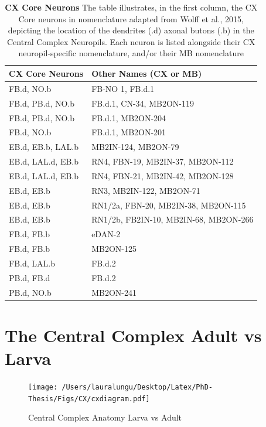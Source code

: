         \begin{table}[h!]
        \centering
        \begin{tabular}{|l|l|}
        \hline
        \textbf{CX Core Neurons} & \textbf{Other Names (CX or MB)} \\
        \hline
        FB.d, NO.b & FB-NO 1, FB.d.1 \\
        FB.d, PB.d, NO.b & FB.d.1, CN-34, MB2ON-119 \\
        FB.d, PB.d, NO.b & FB.d.1, MB2ON-204 \\
        FB.d, NO.b & FB.d.1, MB2ON-201 \\
        EB.d, EB.b, LAL.b & MB2IN-124, MB2ON-79 \\
        EB.d, LAL.d, EB.b & RN4, FBN-19, MB2IN-37, MB2ON-112 \\
        EB.d, LAL.d, EB.b & RN4, FBN-21, MB2IN-42, MB2ON-128 \\
        EB.d, EB.b & RN3, MB2IN-122, MB2ON-71 \\
        EB.d, EB.b & RN1/2a, FBN-20, MB2IN-38, MB2ON-115 \\
        EB.d, EB.b & RN1/2b, FB2IN-10, MB2IN-68, MB2ON-266 \\
        FB.d, FB.b & eDAN-2 \\
        FB.d, FB.b & MB2ON-125 \\
        FB.d, LAL.b & FB.d.2 \\
        PB.d, FB.d & FB.d.2 \\
        PB.d, NO.b & MB2ON-241 \\
        \hline
        \end{tabular}
        \caption[CX Core Neurons]{\textbf{CX Core Neurons} The table illustrates, in the first column, the CX Core neurons in nomenclature adapted from Wolff et al., 2015\citep{wolff2018neuroarchitecture}, depicting the location of the dendrites (.d) axonal butons (.b) in the Central Complex Neuropils. Each neuron is listed alongside their CX neuropil-specific nomenclature, and/or their MB nomenclature}
        \label{CXCoreNeurons}
        \end{table}





    

\section{The Central Complex Adult vs Larva}
    \begin{figure}
        \centering
        \texttt{[image: /Users/lauralungu/Desktop/Latex/PhD-Thesis/Figs/CX/cxdiagram.pdf]}
        \caption[Central Complex Anatomy Larva vs Adult]{Central Complex Anatomy Larva vs Adult}
        \label{cxdiagram}
    \end{figure}

